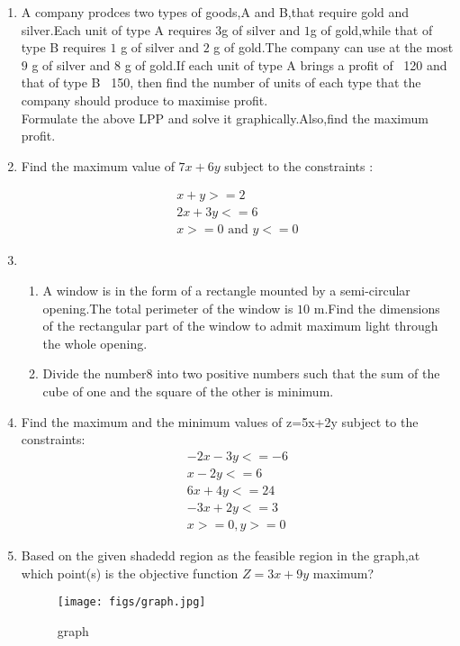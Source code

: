 \documentclass{article}
\begin{document}
\begin{enumerate} 
 \item A company prodces two types of goods,A and B,that require gold and silver.Each unit of type A requires $3$g of silver and $1$g of gold,while that of type B requires $1$ g of silver and $2$ g of gold.The company can use at the most $9$ g of silver and $8$ g of gold.If each unit of  type A brings a profit of \rupee~120 and that of type B \rupee~150, then find the number of units of each type that the company should produce to maximise profit.\\
		Formulate the above LPP and solve it graphically.Also,find the maximum profit.
\item Find the maximum value of $7x+6y$ subject to the constraints :

		\begin{align}
			x+y>=2\\
			2x+3y<=6\\
			x>=0{\text{ and }} y<=0
		\end{align}
\item \begin{enumerate} %
			\item A window is in the form of a rectangle mounted by a semi-circular opening.The total perimeter of the window is $10$ m.Find the dimensions of the rectangular part of the window to admit maximum light through the whole opening.
			\item Divide the number$8$ into two positive numbers such that the sum of the cube of one and the square of the other is minimum.
	               \end{enumerate}
\item 
 Find the maximum and the minimum values of {z=5x+2y} subject to the constraints:
	\\
	\begin{align}
		    -2x-3y<=-6
		 \\  x-2y<=6
		 \\  6x+4y<=24
		  \\  -3x+2y<=3
		  \\  x>=0,y>=0
	\end{align}
	\item Based on the given shadedd region as the feasible region in the graph,at which point(s) is the objective function $Z=3x+9y$ maximum?
	\begin{figure}[H]
	\centering
		\texttt{[image: figs/graph.jpg]}
		\caption{graph}
		\label{fig:graph.jpg}
	\end{figure}

\end{enumerate}
\end{document}
